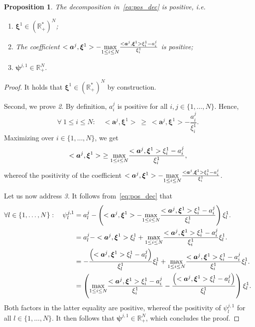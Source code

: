 \documentclass[12pt,a4paper]{article}
\newtheorem{proposition}{Proposition}
\newcommand{\R}{\mathbb R}
\begin{document}
	\begin{proposition}
		The decomposition in~\eqref{eq:pos_dec} is positive, i.e.
		\begin{enumerate}
			\item $\bm\xi^1\in(\R_+^*)^N$;
			\item The coefficient $<\bm a^j, \bm \xi^1> - \underset{1\leq i\leq N}{\rm max}\frac{<\bm a^j, \bm \xi^1>\xi^1_i -  a^j_i}{\xi^1_i}$ is positive;
			\item $\bm\psi^{j,1}\in\R_+^N$.
		\end{enumerate}
		\end{proposition}
	\begin{proof}
		It holds that $\bm\xi^1\in(\R_+^*)^N$ by construction.
		
		Second, we prove \textit{2}.
		By definition, $a^j_i$ is positive for all $i,j\in\{1,\ldots,N\}$. Hence,
		$$
		\forall\ 1\leq i\leq N:\quad 
		 <\bm a^j, \bm \xi^1>\ \geq \ <\bm a^j, \bm \xi^1>- \frac{ a^j_i}{\xi^1_i}.
		$$
		Maximizing over $i\in\{1,\ldots,N\}$, we get 
		$$
		 <\bm a^j, \bm \xi^1>\ \geq \underset{1\leq i\leq N}{\rm max}\frac{<\bm a^j, \bm \xi^1>\xi^1_i -  a^j_i}{\xi^1_i},
		$$
		whereof the positivity of the coefficient $<\bm a^j, \bm \xi^1>-\underset{1\leq i\leq N}{\rm max}\frac{<\bm a^j, \bm \xi^1>\xi^1_i -  a^j_i}{\xi^1_i}$.
		
		Let us now address \textit{3.}
		It follows from~\eqref{eq:pos_dec} that 
		$$
		\begin{alignedat}{2}
		\forall l\in\{1,\ldots,N\}:\quad 
		\psi^{j,1}_l &= a^j_l - \left( <\bm a^j, \bm \xi^1> - \underset{1\leq i\leq N}{\rm max}\frac{<\bm a^j, \bm \xi^1>\xi^1_i -  a^j_i}{\xi^1_i}\right)\xi^1_l.\\
		&=  a^j_l -  <\bm a^j, \bm \xi^1>\xi^1_l + \underset{1\leq i\leq N}{\rm max}\frac{<\bm a^j, \bm \xi^1>\xi^1_i -  a^j_i}{\xi^1_i}\xi^1_l.\\
		&= -\frac{\left(<\bm a^j, \bm \xi^1>\xi^1_l - a^j_l\right) }{\xi^1_l} \xi^1_l
		+ \underset{1\leq i\leq N}{\rm max}\frac{<\bm a^j, \bm \xi^1>\xi^1_i -  a^j_i}{\xi^1_i}\xi^1_l.\\
		&= \left( \underset{1\leq i\leq N}{\rm max}\frac{<\bm a^j, \bm \xi^1>\xi^1_i -  a^j_i}{\xi^1_i}
		- \frac{\left(<\bm a^j, \bm \xi^1>\xi^1_l - a^j_l\right) }{\xi^1_l} \right)\xi^1_l.
		\end{alignedat}
		$$
		Both factors in the latter equality are positive, whereof the positivity of $\psi^{j,1}_l$ for all $l\in \{1,\ldots,N\}$.
		It then follows that $\bm\psi^{j,1}\in\R_+^N$, which concludes the proof.
	\end{proof}
\end{document}
